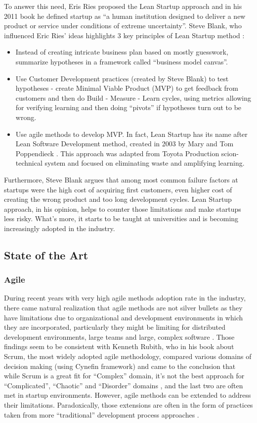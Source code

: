 \documentclass{article}
\begin{document}
To answer this need, Eris Ries proposed the Lean Startup approach and in his 2011 book he defined startup as ``a human institution designed to deliver a new product or service under conditions of extreme uncertainty''\cite{ries2011lean}. Steve Blank, who influenced Eric Ries' ideas highlights 3 key principles of Lean Startup method \cite{blank2013lean}:
\begin{itemize}
  \item Instead of creating intricate business plan based on mostly guesswork, summarize hypotheses in a framework called ``business model canvas''.
  \item Use Customer Development practices (created by Steve Blank) to test hypotheses - create Minimal Viable Product (MVP) to get feedback from customers and then do Build - Measure - Learn cycles, using metrics allowing for verifying learning and then doing ``pivots'' if hypotheses turn out to be wrong.
  \item Use agile methods to develop MVP. In fact, Lean Startup has its name after Lean Software Development method, created in 2003 by Mary and Tom Poppendieck \cite{poppendieck2003lean}. This approach was adapted from Toyota Production scion-technical system and focused on eliminating waste and amplifying learning.
\end{itemize}

Furthermore, Steve Blank argues that among most common failure factors at startups were the high cost of acquiring first customers, even higher cost of creating the wrong product and too long development cycles. Lean Startup approach, in his opinion, helps to counter those limitations and make startups less risky. What's more, it starts to be taught at universities and is becoming increasingly adopted in the industry.

\subsection{State of the Art}
\subsubsection{Agile}
During recent years with very high agile methods adoption rate in the industry, there came natural realization that agile methods are not silver bullets as they have limitations due to organizational and development environments in which they are incorporated, particularly they might be limiting for distributed development environments, large teams and large, complex software \cite{turk2014assumptions}. Those findings seem to be consistent with Kenneth Rubith, who in his book about Scrum, the most widely adopted agile methodology, compared various domains of decision making (using Cynefin framework) and came to the conclusion that while Scrum is a great fit for ``Complex'' domain, it's not the best approach for ``Complicated'', ``Chaotic'' and ``Disorder'' domains \cite{rubin2012essential}, and the last two are often met in startup environments. However, agile methods can be extended to address their limitations. Paradoxically, those extensions are often in the form of practices taken from more ``traditional'' development process approaches \cite{turk2014limitations}.
\end{document}
